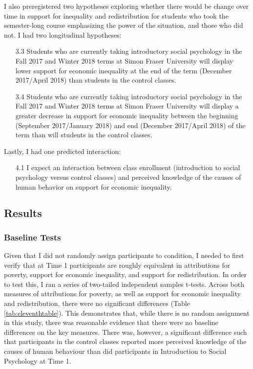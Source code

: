 \documentclass{sfuthesis}
\begin{document}
\begin{flushleft}
I also preregistered two hypotheses exploring whether there would be change over time in support for inequality and redistribution for students who took the semester-long course emphasizing the power of the situation, and those who did not. I had two longitudinal hypotheses:
\end{flushleft}

\begin{itemize}
  \item [3.3]	Students who are currently taking introductory social psychology in the Fall 2017 and Winter 2018 terms at Simon Fraser University will display lower support for economic inequality at the end of the term (December 2017/April 2018) than students in the control classes.
  \item [3.4]	Students who are currently taking introductory social psychology in the Fall 2017 and Winter 2018 terms at Simon Fraser University will display a greater decrease in support for economic inequality between the beginning (September 2017/January 2018) and end (December 2017/April 2018) of the term than will students in the control classes.
\end{itemize}

\begin{flushleft}
Lastly, I had one predicted interaction:
\end{flushleft}

\begin{itemize}
  \item [4.1]	I expect an interaction between class enrollment (introduction to social psychology versus control classes) and perceived knowledge of the causes of human behavior on support for economic inequality.
\end{itemize}

\subsection{Results}
\subsubsection{Baseline Tests}

Given that I did not randomly assign participants to condition, I needed to first verify that at Time 1 participants are roughly equivalent in attributions for poverty, support for economic inequality, and support for redistribution. In order to test this, I ran a series of two-tailed independent samples t-tests. Across both measures of attributions for poverty, as well as support for economic inequality and redistribution, there were no significant differences (Table \ref{tab:eleventhtable}). This demonstrates that, while there is no random assignment in this study, there was reasonable evidence that there were no baseline differences on the key measures. There was, however, a significant difference such that participants in the control classes reported more perceived knowledge of the causes of human behaviour than did participants in Introduction to Social Psychology at Time 1. 
\end{document}
